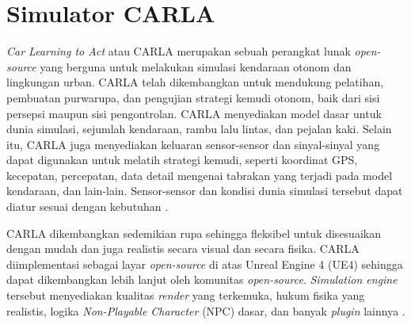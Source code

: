 

\section{Simulator CARLA}

\textit{Car Learning to Act} atau CARLA merupakan sebuah perangkat lunak
\textit{open-source} yang berguna untuk melakukan simulasi kendaraan otonom dan
lingkungan urban. CARLA telah dikembangkan untuk mendukung pelatihan, pembuatan
purwarupa, dan pengujian strategi kemudi otonom, baik dari sisi persepsi maupun
sisi pengontrolan. CARLA menyediakan model dasar untuk dunia simulasi, sejumlah
kendaraan, rambu lalu lintas, dan pejalan kaki. Selain itu, CARLA juga
menyediakan keluaran sensor-sensor dan sinyal-sinyal yang dapat digunakan untuk
melatih strategi kemudi, seperti koordinat GPS, kecepatan, percepatan, data
detail mengenai tabrakan yang terjadi pada model kendaraan, dan lain-lain.
Sensor-sensor dan kondisi dunia simulasi tersebut dapat diatur sesuai dengan
kebutuhan \parencite{carla-dosovitskiy}.

CARLA dikembangkan sedemikian rupa sehingga fleksibel untuk disesuaikan dengan
mudah dan juga realistis secara visual dan secara fisika. CARLA diimplementasi
sebagai layar \textit{open-source} di atas Unreal Engine 4 (UE4) sehingga dapat
dikembangkan lebih lanjut oleh komunitas \textit{open-source}.
\textit{Simulation engine} tersebut menyediakan kualitas \textit{render} yang
terkemuka, hukum fisika yang realistis, logika \textit{Non-Playable Character}
(NPC) dasar, dan banyak \textit{plugin} lainnya \parencite{carla-dosovitskiy}.

